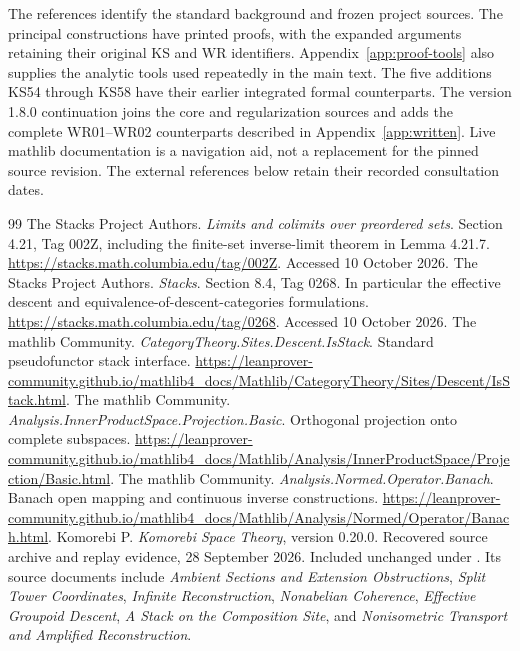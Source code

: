 \clearpage
{}\label{app:references}
The references identify the standard background and frozen project sources. The principal constructions have printed proofs, with the expanded arguments retaining their original KS and WR identifiers. Appendix~\ref{app:proof-tools} also supplies the analytic tools used repeatedly in the main text. The five additions KS54 through KS58 have their earlier integrated formal counterparts. The version 1.8.0 continuation joins the core and regularization sources and adds the complete WR01--WR02 counterparts described in Appendix~\ref{app:written}. Live mathlib documentation is a navigation aid, not a replacement for the pinned source revision. The external references below retain their recorded consultation dates.

\begin{thebibliography}{99}
 The Stacks Project Authors. \emph{Limits and colimits over preordered sets}. Section 4.21, Tag 002Z, including the finite-set inverse-limit theorem in Lemma 4.21.7. \url{https://stacks.math.columbia.edu/tag/002Z}. Accessed 10 October 2026.
 The Stacks Project Authors. \emph{Stacks}. Section 8.4, Tag 0268. In particular the effective descent and equivalence-of-descent-categories formulations. \url{https://stacks.math.columbia.edu/tag/0268}. Accessed 10 October 2026.
 The mathlib Community. \emph{CategoryTheory.Sites.Descent.IsStack}. Standard pseudofunctor stack interface. \url{https://leanprover-community.github.io/mathlib4_docs/Mathlib/CategoryTheory/Sites/Descent/IsStack.html}.
 The mathlib Community. \emph{Analysis.InnerProductSpace.Projection.Basic}. Orthogonal projection onto complete subspaces. \url{https://leanprover-community.github.io/mathlib4_docs/Mathlib/Analysis/InnerProductSpace/Projection/Basic.html}.
 The mathlib Community. \emph{Analysis.Normed.Operator.Banach}. Banach open mapping and continuous inverse constructions. \url{https://leanprover-community.github.io/mathlib4_docs/Mathlib/Analysis/Normed/Operator/Banach.html}.
 Komorebi P. \emph{Komorebi Space Theory}, version 0.20.0. Recovered source archive and replay evidence, 28 September 2026. Included unchanged under . Its source documents include \emph{Ambient Sections and Extension Obstructions}, \emph{Split Tower Coordinates}, \emph{Infinite Reconstruction}, \emph{Nonabelian Coherence}, \emph{Effective Groupoid Descent}, \emph{A Stack on the Composition Site}, and \emph{Nonisometric Transport and Amplified Reconstruction}.

\end{thebibliography}
